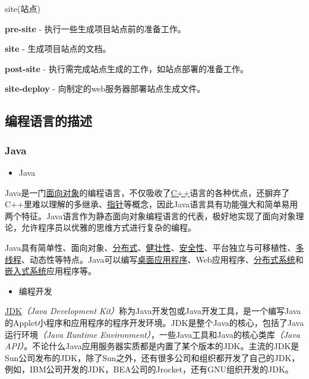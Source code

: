 \documentclass[
]{article}
\begin{document}
site(站点)

\textbf{pre-site} - 执行一些生成项目站点前的准备工作。

\textbf{site} - 生成项目站点的文档。

\textbf{post-site} - 执行需完成站点生成的工作，如站点部署的准备工作。

\textbf{site-deploy} - 向制定的web服务器部署站点生成文件。

\hypertarget{ux7f16ux7a0bux8bedux8a00ux7684ux63cfux8ff0}{%
\subsection{编程语言的描述}\label{ux7f16ux7a0bux8bedux8a00ux7684ux63cfux8ff0}}

\hypertarget{java}{%
\subsubsection{Java}\label{java}}

\begin{itemize}
\item
  Java
\end{itemize}

Java是一门\href{https://baike.baidu.com/item/面向对象}{面向对象}的编程语言，不仅吸收了\href{https://baike.baidu.com/item/C\%2B\%2B}{C++}语言的各种优点，还摒弃了C++里难以理解的多继承、\href{https://baike.baidu.com/item/指针/2878304}{指针}等概念，因此Java语言具有功能强大和简单易用两个特征。Java语言作为静态面向对象编程语言的代表，极好地实现了面向对象理论，允许程序员以优雅的思维方式进行复杂的编程。

Java具有简单性、面向对象、\href{https://baike.baidu.com/item/分布式/19276232}{分布式}、\href{https://baike.baidu.com/item/健壮性/4430133}{健壮性}、\href{https://baike.baidu.com/item/安全性/7664678}{安全性}、平台独立与可移植性、\href{https://baike.baidu.com/item/多线程/1190404}{多线程}、动态性等特点。Java可以编写\href{https://baike.baidu.com/item/桌面应用程序/2331979}{桌面应用程序}、Web应用程序、\href{https://baike.baidu.com/item/分布式系统/4905336}{分布式系统}和\href{https://baike.baidu.com/item/嵌入式系统/186978}{嵌入式系统}应用程序等。

\begin{itemize}
\item
  编程开发
\end{itemize}

\href{https://baike.baidu.com/item/JDK/1011}{JDK}\emph{（Java
Development
Kit）}称为Java开发包或Java开发工具，是一个编写Java的Applet小程序和应用程序的程序开发环境。JDK是整个Java的核心，包括了Java运行环境\emph{（Java
Runtime Environment）}，一些Java工具和Java的核心类库\emph{（Java
API）}。不论什么Java应用服务器实质都是内置了某个版本的JDK。主流的JDK是Sun公司发布的JDK，除了Sun之外，还有很多公司和组织都开发了自己的JDK，例如，IBM公司开发的JDK，BEA公司的Jrocket，还有GNU组织开发的JDK。
\end{document}
